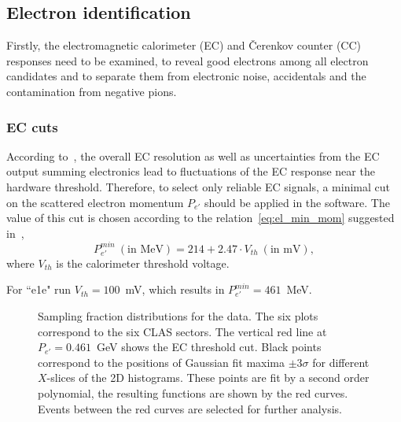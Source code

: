 \subsection{Electron identification}
\label{Sect:el_id} 
Firstly, the electromagnetic calorimeter (EC) and \v Cerenkov counter (CC) responses need to be examined, to reveal good electrons among all electron candidates and to separate them from electronic noise, accidentals and the contamination from negative pions.

\subsubsection{EC cuts}
\label{Sect:ec_cuts}

According to~\cite{Egian:007}, the overall EC resolution as well as uncertainties from the EC output summing electronics lead to fluctuations of the EC response near the hardware threshold. Therefore, to select only reliable EC signals, a minimal cut on the scattered electron momentum $P_{e'}$ should be applied in the software. The value of this cut is chosen according to the relation~\eqref{eq:el_min_mom} suggested in~\cite{Egian:007},
\begin{equation}
P_{e'}^{min}~(\textrm{in~MeV}) = 214 + 2.47\cdot V_{th}~(\textrm{in~mV}),
\label{eq:el_min_mom}
\end{equation}
where $V_{th}$ is the calorimeter threshold voltage.

For ``e1e" run $V_{th} = 100$~mV, which results in $P_{e'}^{min} = 461$~MeV.

\begin{figure}[htp]
\begin{center}
\caption{\small Sampling fraction distributions for the data. The six plots correspond to the six CLAS sectors. The vertical red line at $P_{e'} = 0.461$~GeV shows the EC threshold cut. Black points correspond to the positions of Gaussian fit maxima $\pm 3\sigma$ for different $X$-slices of the 2D histograms. These points are fit by a second order polynomial, the resulting functions are shown by the red curves. Events between the red curves are selected for further analysis.} \label{fig:ec_cut_data}
\end{center}
\end{figure}

